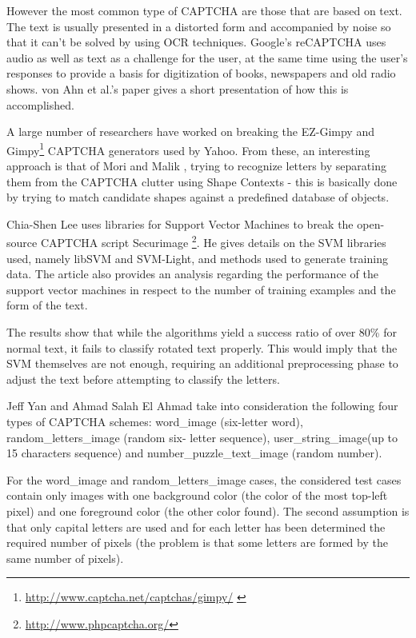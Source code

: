 \documentclass[a4paper,12pt]{article}
\begin{document}
However the most common type of CAPTCHA are those that are based
on text. The text is usually presented in a distorted form
and accompanied by noise so that it can't be solved by using OCR
techniques. Google's reCAPTCHA uses audio as well as text as
a challenge for the user, at the same time using the user's
responses to provide a basis for digitization of books, newspapers
and old radio shows. von Ahn et al.'s paper \cite{vonAhn12092008}
gives a short presentation of how this is accomplished.

A large number of researchers have worked on breaking the EZ-Gimpy
and Gimpy\footnote{\url{http://www.captcha.net/captchas/gimpy/}
\label{fn:gimpy}} CAPTCHA generators used by Yahoo. From these, an
interesting approach is that of Mori and Malik
\cite{Mori:2003:ROA:1965841.1965858}, trying to recognize letters
by separating them from the CAPTCHA clutter using Shape Contexts
 - this is basically done by trying to match candidate shapes
 against a predefined database of objects.

Chia-Shen Lee \cite{ShenLee} uses libraries for Support Vector
Machines to break the open-source CAPTCHA script Securimage
\footnote{\url{http://www.phpcaptcha.org/}\label{fn:securimage}}. He
gives details on the SVM libraries used, namely libSVM and SVM-Light, and
methods used to generate training data. The article also provides
an analysis regarding the performance of the support vector machines
in respect to the number of training examples and the form of
the text.

The results show that while the algorithms yield a success ratio
of over 80\% for normal text, it fails to classify rotated text
properly. This would imply that the SVM themselves are not
enough, requiring an additional preprocessing phase to adjust
the text before attempting to classify the letters.

Jeff Yan and Ahmad Salah El Ahmad \cite{Yan_breakingvisual}
take into consideration the following four types of CAPTCHA schemes:
word\_image (six-letter word), random\_letters\_image (random six-
letter sequence), user\_string\_image(up to 15 characters sequence) and
number\_puzzle\_text\_image (random number).

For the word\_image and random\_letters\_image cases, the considered
test cases contain only images with one background color (the color of
the most top-left pixel) and one foreground color (the other color
found). The second assumption is that only capital letters are used
and for each letter has been determined the required number of pixels
(the problem is that some letters are formed by the same number of
pixels).
\end{document}
